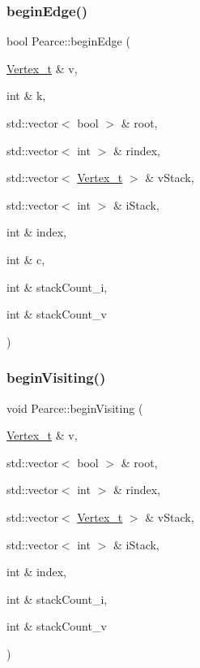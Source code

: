 \subsubsection{\texorpdfstring{begin\+Edge()}{beginEdge()}}
{\footnotesize\ttfamily bool Pearce\+::begin\+Edge (\begin{DoxyParamCaption}\item[{\hyperlink{class_graph_component_ae67114a6ce5a001dc35e1996e1b45aa0_ae67114a6ce5a001dc35e1996e1b45aa0}{Vertex\+\_\+t} \&}]{v,  }\item[{int \&}]{k,  }\item[{std\+::vector$<$ bool $>$ \&}]{root,  }\item[{std\+::vector$<$ int $>$ \&}]{rindex,  }\item[{std\+::vector$<$ \hyperlink{class_graph_component_ae67114a6ce5a001dc35e1996e1b45aa0_ae67114a6ce5a001dc35e1996e1b45aa0}{Vertex\+\_\+t} $>$ \&}]{v\+Stack,  }\item[{std\+::vector$<$ int $>$ \&}]{i\+Stack,  }\item[{int \&}]{index,  }\item[{int \&}]{c,  }\item[{int \&}]{stack\+Count\+\_\+i,  }\item[{int \&}]{stack\+Count\+\_\+v }\end{DoxyParamCaption})}

\mbox{\label{class_pearce_ab9090eeb4466701bc8ba913d8f9f5b50_ab9090eeb4466701bc8ba913d8f9f5b50}} 
\subsubsection{\texorpdfstring{begin\+Visiting()}{beginVisiting()}}
{\footnotesize\ttfamily void Pearce\+::begin\+Visiting (\begin{DoxyParamCaption}\item[{\hyperlink{class_graph_component_ae67114a6ce5a001dc35e1996e1b45aa0_ae67114a6ce5a001dc35e1996e1b45aa0}{Vertex\+\_\+t} \&}]{v,  }\item[{std\+::vector$<$ bool $>$ \&}]{root,  }\item[{std\+::vector$<$ int $>$ \&}]{rindex,  }\item[{std\+::vector$<$ \hyperlink{class_graph_component_ae67114a6ce5a001dc35e1996e1b45aa0_ae67114a6ce5a001dc35e1996e1b45aa0}{Vertex\+\_\+t} $>$ \&}]{v\+Stack,  }\item[{std\+::vector$<$ int $>$ \&}]{i\+Stack,  }\item[{int \&}]{index,  }\item[{int \&}]{stack\+Count\+\_\+i,  }\item[{int \&}]{stack\+Count\+\_\+v }\end{DoxyParamCaption})}

